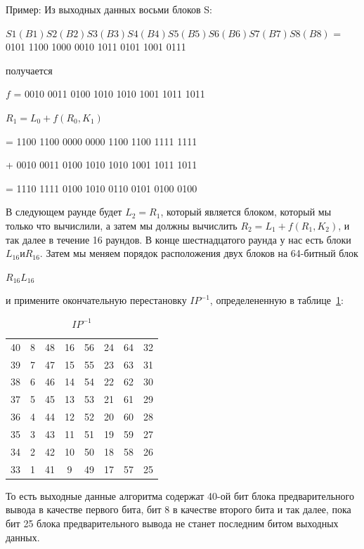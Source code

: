 Пример: Из выходных данных восьми блоков S:

$S1(B1)S2(B2)S3(B3)S4(B4)S5(B5)S6(B6)S7(B7)S8(B8)$ = 0101 1100 1000 0010 1011 0101 1001 0111

получается

$f$ = 0010 0011 0100 1010 1010 1001 1011 1011

$R_1 = L_0 + f(R_0, K_1)$

= 1100 1100 0000 0000 1100 1100 1111 1111

+ 0010 0011 0100 1010 1010 1001 1011 1011

= 1110 1111 0100 1010 0110 0101 0100 0100

В следующем раунде будет $L_2 = R_1$, который является блоком, который мы только что вычислили, а затем мы должны вычислить $R_2 = L_1 + f(R_1, K_2)$, и так далее в течение 16 раундов.
В конце шестнадцатого раунда у нас есть блоки $L_{16} и R_{16}$. 
Затем мы меняем порядок расположения двух блоков на 64-битный блок

$R_{16}L_{16}$

и примените окончательную перестановку $IP^{-1}$, определененную в таблице~\ref{tbl:inv-ip}:

\begin{table}[ht!]
    \begin{center}
	\captionsetup{justification=raggedright,singlelinecheck=off}
	    \caption{\label{tbl:inv-ip} $IP^{-1}$}
        \begin{tabular}{ |c c c c c c c c|}
                40 & 8 & 48 & 16 & 56 & 24 & 64 & 32 \\
39 & 7 & 47 & 15 & 55 & 23 & 63 & 31 \\
38 & 6 & 46 & 14 & 54 & 22 & 62 & 30 \\
37 & 5 & 45 & 13 & 53 & 21 & 61 & 29 \\
36 & 4 & 44 & 12 & 52 & 20 & 60 & 28 \\
35 & 3 & 43 & 11 & 51 & 19 & 59 & 27 \\
34 & 2 & 42 & 10 & 50 & 18 & 58 & 26 \\
33 & 1 & 41 & 9 & 49 & 17 & 57 & 25
        \end{tabular}
    \end{center}
\end{table}

То есть выходные данные алгоритма содержат 40-ой бит блока предварительного вывода в качестве первого бита, бит 8 в качестве второго бита и так далее, пока бит 25 блока предварительного вывода не станет последним битом выходных данных.

